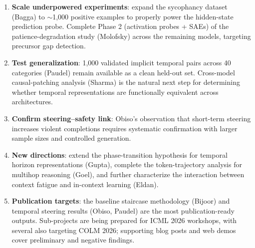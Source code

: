 \documentclass[final]{sparreport}
\begin{document}
\begin{enumerate}
  \item \textbf{Scale underpowered experiments}: expand the sycophancy dataset (Bagga) to $\sim$1,000 positive examples to properly power the hidden-state prediction probe. Complete Phase 2 (activation probes + SAEs) of the patience-degradation study (Molofsky) across the remaining models, targeting precursor gap detection.

  \item \textbf{Test generalization}: 1,000 validated implicit temporal pairs across 40 categories (Paudel) remain available as a clean held-out set. Cross-model causal-patching analysis (Sharma) is the natural next step for determining whether temporal representations are functionally equivalent across architectures.

  \item \textbf{Confirm steering--safety link}: Obiso's observation that short-term steering increases violent completions requires systematic confirmation with larger sample sizes and controlled generation.

  \item \textbf{New directions}: extend the phase-transition hypothesis for temporal horizon representations (Gupta), complete the token-trajectory analysis for multihop reasoning (Goel), and further characterize the interaction between context fatigue and in-context learning (Eldan).

  \item \textbf{Publication targets}: the baseline staircase methodology (Bijoor) and temporal steering results (Obiso, Paudel) are the most publication-ready outputs. Sub-projects are being prepared for ICML 2026 workshops, with several also targeting COLM 2026; supporting blog posts and web demos cover preliminary and negative findings.
\end{enumerate}



\end{document}
